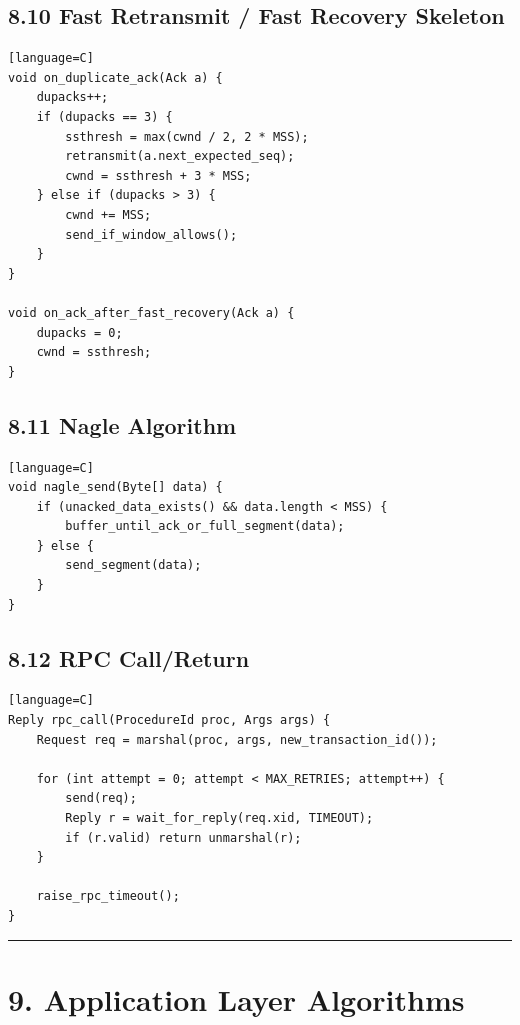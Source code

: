 \documentclass[11pt]{article}
\begin{document}
\subsection{8.10 Fast Retransmit / Fast Recovery
Skeleton}\label{fast-retransmit-fast-recovery-skeleton}

\begin{verbatim}[language=C]
void on_duplicate_ack(Ack a) {
    dupacks++;
    if (dupacks == 3) {
        ssthresh = max(cwnd / 2, 2 * MSS);
        retransmit(a.next_expected_seq);
        cwnd = ssthresh + 3 * MSS;
    } else if (dupacks > 3) {
        cwnd += MSS;
        send_if_window_allows();
    }
}

void on_ack_after_fast_recovery(Ack a) {
    dupacks = 0;
    cwnd = ssthresh;
}
\end{verbatim}

\subsection{8.11 Nagle Algorithm}\label{nagle-algorithm}

\begin{verbatim}[language=C]
void nagle_send(Byte[] data) {
    if (unacked_data_exists() && data.length < MSS) {
        buffer_until_ack_or_full_segment(data);
    } else {
        send_segment(data);
    }
}
\end{verbatim}

\subsection{8.12 RPC Call/Return}\label{rpc-callreturn}

\begin{verbatim}[language=C]
Reply rpc_call(ProcedureId proc, Args args) {
    Request req = marshal(proc, args, new_transaction_id());

    for (int attempt = 0; attempt < MAX_RETRIES; attempt++) {
        send(req);
        Reply r = wait_for_reply(req.xid, TIMEOUT);
        if (r.valid) return unmarshal(r);
    }

    raise_rpc_timeout();
}
\end{verbatim}

\begin{center}\rule{0.5\linewidth}{0.5pt}\end{center}

\section{9. Application Layer
Algorithms}\label{application-layer-algorithms}
\end{document}
